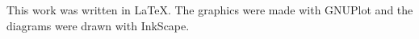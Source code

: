 \begin{center}
\vspace*{8cm}


This work was written in \LaTeX{}. The graphics were made with GNUPlot and the diagrams were drawn with InkScape.


\end{center}